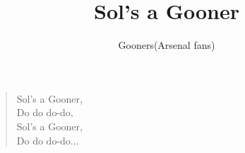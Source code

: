 \documentclass[a4paper,12pt]{article}
\title{Sol's a Gooner}
\author{Gooners(Arsenal fans)}
\date{}
\begin{document}
	
	\maketitle
	
	\begin{verse}
		
		Sol's a Gooner, \\
		Do do do-do, \\
		Sol's a Gooner, \\
		Do do do-do$\ldots$
		
	\end{verse}
	
\end{document}
